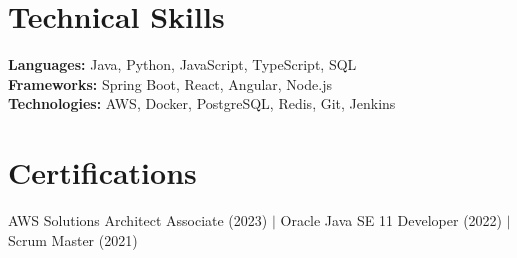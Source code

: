 \documentclass[11pt,a4paper]{article}
\begin{document}
\vspace{8pt}


\section{Technical Skills}

\textbf{Languages:} Java, Python, JavaScript, TypeScript, SQL\\
\textbf{Frameworks:} Spring Boot, React, Angular, Node.js\\
\textbf{Technologies:} AWS, Docker, PostgreSQL, Redis, Git, Jenkins\\

\vspace{8pt}


\section{Certifications}

AWS Solutions Architect Associate (2023) $|$ Oracle Java SE 11 Developer (2022) $|$ Scrum Master (2021)
\end{document}
